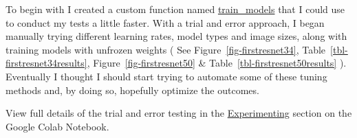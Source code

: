 \documentclass[
  letterpaper,
  DIV=11,
  numbers=noendperiod]{scrartcl}
\begin{document}
To begin with I created a custom function named
\protect\hyperlink{custom-trainmodels}{train\_models} that I could use
to conduct my tests a little faster. With a trial and error approach, I
began manually trying different learning rates, model types and image
sizes, along with training models with unfrozen weights ( See
Figure~\ref{fig-firstresnet34}, Table~\ref{tbl-firstresnet34results},
Figure~\ref{fig-firstresnet50} \& Table~\ref{tbl-firstresnet50results}
). Eventually I thought I should start trying to automate some of these
tuning methods and, by doing so, hopefully optimize the outcomes.

\begin{tcolorbox}[enhanced jigsaw, opacityback=0, toprule=.15mm, colbacktitle=quarto-callout-note-color!10!white, opacitybacktitle=0.6, leftrule=.75mm, colback=white, breakable, bottomtitle=1mm, arc=.35mm, toptitle=1mm, left=2mm, colframe=quarto-callout-note-color-frame, titlerule=0mm, coltitle=black, rightrule=.15mm, title=\textcolor{quarto-callout-note-color}{\faInfo}\hspace{0.5em}{Note}, bottomrule=.15mm]

View full details of the trial and error testing in the
\href{https://colab.research.google.com/drive/1yeosl7vmtW30dD0OBt96jLhi_p4ViRjI\#scrollTo=hEA2iUvtsu6E}{Experimenting}
section on the Google Colab Notebook.

\end{tcolorbox}
\end{document}
